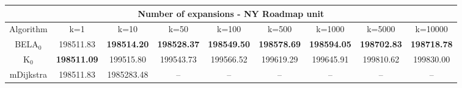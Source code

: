 \begin{tabular}{c|cccccccc}\toprule
\multicolumn{9}{c}{Number of expansions - NY Roadmap unit}\\ \midrule
Algorithm & k=1 & k=10 & k=50 & k=100 & k=500 & k=1000 & k=5000 & k=10000 \\ \midrule
BELA$_0$ & 198511.83 & \textbf{198514.20} & \textbf{198528.37} & \textbf{198549.50} & \textbf{198578.69} & \textbf{198594.05} & \textbf{198702.83} & \textbf{198718.78} \\
K$_0$ & \textbf{198511.09} & 199515.80 & 199543.73 & 199566.52 & 199619.29 & 199645.91 & 199810.62 & 199830.00 \\
mDijkstra & 198511.83 & 1985283.48 & -- & -- & -- & -- & -- & -- \\ \bottomrule 
\end{tabular}
